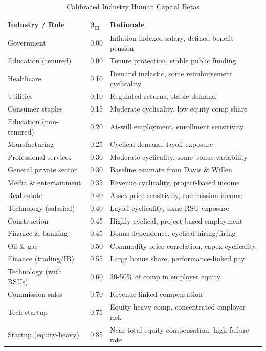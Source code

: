 \documentclass[11pt]{article}
\begin{document}
\begin{table}[ht]
\centering
\caption{Calibrated Industry Human Capital Betas}\label{tab:betas}
\smallskip
\begin{tabular}{@{}llp{6cm}@{}}
\toprule
\textbf{Industry / Role} & $\boldsymbol{\beta_H}$ & \textbf{Rationale} \\
\midrule
Government                & 0.00 & Inflation-indexed salary, defined benefit pension \\
Education (tenured)       & 0.00 & Tenure protection, stable public funding \\
Healthcare                & 0.10 & Demand inelastic, some reimbursement cyclicality \\
Utilities                 & 0.10 & Regulated returns, stable demand \\
Consumer staples          & 0.15 & Moderate cyclicality, low equity comp share \\
Education (non-tenured)   & 0.20 & At-will employment, enrollment sensitivity \\
Manufacturing             & 0.25 & Cyclical demand, layoff exposure \\
Professional services     & 0.30 & Moderate cyclicality, some bonus variability \\
General private sector    & 0.30 & Baseline estimate from Davis \& Willen \\
Media \& entertainment    & 0.35 & Revenue cyclicality, project-based income \\
Real estate               & 0.40 & Asset price sensitivity, commission income \\
Technology (salaried)     & 0.40 & Layoff cyclicality, some RSU exposure \\
Construction              & 0.45 & Highly cyclical, project-based employment \\
Finance \& banking        & 0.45 & Bonus dependence, cyclical hiring/firing \\
Oil \& gas                & 0.50 & Commodity price correlation, capex cyclicality \\
Finance (trading/IB)      & 0.55 & Large bonus share, performance-linked pay \\
Technology (with RSUs)    & 0.60 & 30-50\% of comp in employer equity \\
Commission sales          & 0.70 & Revenue-linked compensation \\
Tech startup              & 0.75 & Equity-heavy comp, concentrated employer risk \\
Startup (equity-heavy)    & 0.85 & Near-total equity compensation, high failure rate \\
\bottomrule
\end{tabular}
\end{table}
\end{document}
